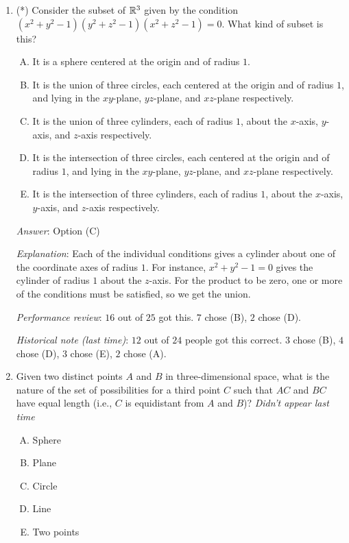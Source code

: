 \documentclass[10pt]{amsart}
\begin{document}
\begin{enumerate}

\item (*) Consider the subset of $\mathbb{R}^3$ given by the condition $(x^2 +
  y^2 - 1)(y^2 + z^2 - 1)(x^2 + z^2 - 1) = 0$. What kind of subset is
  this?

  \begin{enumerate}[(A)]
  \item It is a sphere centered at the origin and of radius $1$.
  \item It is the union of three circles, each centered at the origin
    and of radius $1$, and lying in the $xy$-plane, $yz$-plane, and
    $xz$-plane respectively.
  \item It is the union of three cylinders, each of radius $1$, about
    the $x$-axis, $y$-axis, and $z$-axis respectively.
  \item It is the intersection of three circles, each centered at the origin
    and of radius $1$, and lying in the $xy$-plane, $yz$-plane, and
    $xz$-plane respectively.
  \item It is the intersection of three cylinders, each of radius $1$, about
    the $x$-axis, $y$-axis, and $z$-axis respectively.
  \end{enumerate}

  {\em Answer}: Option (C)

  {\em Explanation}: Each of the individual conditions gives a
  cylinder about one of the coordinate axes of radius $1$. For
  instance, $x^2 + y^2 - 1 = 0$ gives the cylinder of radius $1$ about
  the $z$-axis. For the product to be zero, one or more of the
  conditions must be satisfied, so we get the union.

  {\em Performance review}: $16$ out of $25$ got this. $7$ chose (B),
  $2$ chose (D).

  {\em Historical note (last time)}: $12$ out of $24$ people got this
  correct. $3$ chose (B), $4$ chose (D), $3$ chose (E), $2$ chose (A).

\item Given two distinct points $A$ and $B$ in three-dimensional
  space, what is the nature of the set of possibilities for a third
  point $C$ such that $AC$ and $BC$ have equal length (i.e., $C$ is
  equidistant from $A$ and $B$)? {\em Didn't appear last time}

  \begin{enumerate}[(A)]
  \item Sphere
  \item Plane
  \item Circle
  \item Line
  \item Two points
  \end{enumerate}


\end{enumerate}
\end{document}
